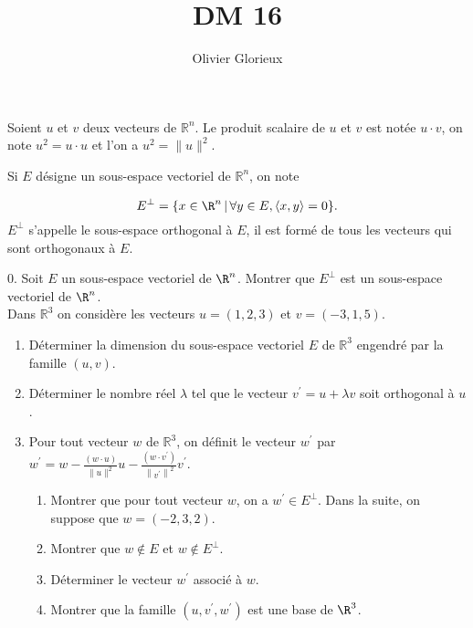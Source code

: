 \documentclass[a4paper, 11pt,reqno]{article}
\author{Olivier Glorieux}
\begin{document}
\title{DM 16}


\vspace{1cm}
\begin{exercice}
Soient $u$ et $v$ deux vecteurs de $\mathbb{R}^{n}$.
Le produit scalaire de $u$ et $v$ est notée $u \cdot v$, on note $u^{2}=u \cdot u$ et l'on a $u^{2}=\|u\|^{2}$.


Si $E$ désigne un sous-espace vectoriel de $\mathbb{R}^{n}$, on note 

$$E^{\perp} =\{ x \in \R^n \, |\,  \forall y\in E, \langle x,y\rangle=0\}.$$
$E^{\perp}$ s'appelle le sous-espace orthogonal à $E$, il est formé de tous les vecteurs qui sont orthogonaux à $E$. 

0. Soit $E$ un sous-espace vectoriel de $\R^n$. Montrer que $E^{\perp}$ est un sous-espace vectoriel de $\R^n$. \\

Dans $\mathbb{R}^{3}$ on considère les vecteurs $u=(1,2,3)$ et $v=(-3,1,5)$.
\begin{enumerate}
\item Déterminer la dimension du sous-espace vectoriel $E$ de $\mathbb{R}^{3}$ engendré par la famille $(u, v)$.
\item  Déterminer le nombre réel $\lambda$ tel que le vecteur $v^{\prime}=u+\lambda v$ soit orthogonal à $u$.

\item Pour tout vecteur $w$ de $\mathbb{R}^{3}$, on définit le vecteur $w^{\prime}$ par $w^{\prime}=w-\frac{(w \cdot u)}{\|u\|^{2}} u-\frac{\left(w \cdot v^{\prime}\right)}{\left\|v^{\prime}\right\|^{2}} v^{\prime}$.
\begin{enumerate}
\item  Montrer que pour tout vecteur $w$, on a $w^{\prime} \in E^{\perp}$.
Dans la suite, on suppose que $w=(-2,3,2)$.
\item  Montrer que $w \notin E$ et $w \notin E^{\perp}$.
\item  Déterminer le vecteur $w^{\prime}$ associé à $w$.
\item  Montrer que la famille $\left(u, v^{\prime}, w^{\prime}\right)$ est une base de $\R^3$.
\end{enumerate}

\end{enumerate}

\end{exercice}
\end{document}
